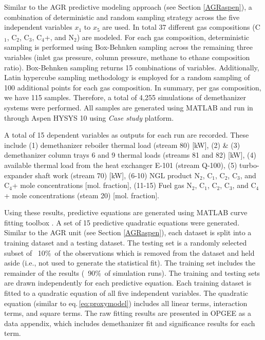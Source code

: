 \documentclass[11pt]{report}
\begin{document}
Similar to the AGR predictive modeling approach (see Section \ref{AGRaspen}), a combination of deterministic and random sampling strategy across the five independent variables $x_1$ to $x_5$ are used. In total 37 different gas compositions (C$_1$, C$_2$, C$_3$, C$_4$+, and N$_2$) are modeled. For each gas composition, deterministic sampling is performed using Box-Behnken sampling across the remaining three variables (inlet gas pressure, column pressure, methane to ethane composition ratio). Box-Behnken sampling returns 15 combinations of variables. Additionally, Latin hypercube sampling methodology is employed for a random sampling of 100 additional points for each gas composition. In summary, per gas composition, we have 115 samples. Therefore, a total of 4,255 simulations of demethanizer systems were performed. All samples are generated using MATLAB \cite{Mathworks2016} and run in through Aspen HYSYS 10 using \emph{Case study} platform.

A total of 15 dependent variables as outputs for each run are recorded. These include (1) demethanizer reboiler thermal load (stream 80) [kW], (2) & (3) demethanizer column trays 6 and 9 thermal loads (streams 81 and 82) [kW], (4) available thermal load from the heat exchanger E-101 (stream Q-100), (5) turbo-expander shaft work (stream 70) [kW], (6-10) NGL product N$_2$, C$_1$, C$_2$, C$_3$, and C$_4$+ mole concentrations [mol. fraction], (11-15) Fuel gas N$_2$, C$_1$, C$_2$, C$_3$, and C$_4$+ mole concentrations (steam 20) [mol. fraction].

Using these results, predictive equations are generated using MATLAB curve fitting toolbox \cite{Mathworks2016}. A set of 15 predictive quadratic equations were generated. Similar to the AGR unit (see Section \ref{AGRaspen}), each dataset is split into a training dataset and a testing dataset. The testing set is a randomly selected subset of ~10\%\ of the observations which is removed from the dataset and held aside (i.e., not used to generate the statistical fit). The training set includes the remainder of the results (~90\%\ of simulation runs). The training and testing sets are drawn independently for each predictive equation. Each training dataset is fitted to a quadratic equation of all five independent variables. The quadratic equation (similar to eq.\,\eqref{eq:proxymodel}) includes all linear terms, interaction terms, and square terms. The raw fitting results are presented in OPGEE as a data appendix, which includes demethanizer fit and significance results for each term. 
\end{document}
